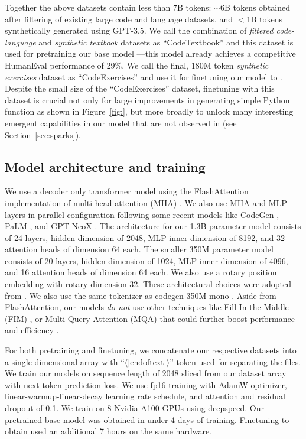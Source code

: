 Together the above datasets contain less than 7B tokens: $\sim$6B tokens obtained after filtering of existing large code and language datasets, and $<$1B tokens synthetically generated using GPT-3.5. 
We call the combination of \textit{filtered code-language} and \textit{synthetic textbook} datasets as ``CodeTextbook'' and this dataset is used for pretraining our base model \phionebase\!\!---this model already achieves a competitive HumanEval performance of 29\%. We call the final, 180M token \textit{synthetic exercises} dataset as ``CodeExercises'' and use it for finetuning our \phionebase model to \phione\!\!. Despite the small size of the ``CodeExercises'' dataset, finetuning with this dataset is crucial not only for large improvements in generating simple Python function as shown in Figure~\ref{fig:}, but more broadly to unlock many interesting emergent capabilities in our \phione model that are not observed in \phionebase (see Section~\ref{sec:sparks}). 
\fi
\subsection{Model architecture and training}\label{sec:arch}
 We use a decoder only transformer \cite{Vas17} model using the FlashAttention implementation of multi-head attention (MHA) \cite{dao2022flashattention}. %
 We also use MHA and MLP layers in parallel configuration following some recent models like CodeGen \cite{codegen}, PaLM \cite{chowdhery2022palm}, and GPT-NeoX \cite{gpt-neox-library}. The architecture for our 1.3B parameter \phione model consists of 24 layers, hidden dimension of 2048, MLP-inner dimension of 8192, and 32 attention heads of dimension 64 each. The smaller 350M parameter \phionesmall model consists of 20 layers, hidden dimension of 1024, MLP-inner dimension of 4096, and 16 attention heads of dimension 64 each. We also use a rotary position embedding \cite{rope-paper} with rotary dimension 32. These architectural choices were adopted from \cite{codegen}. We also use the same tokenizer as codegen-350M-mono \cite{codegen}. Aside from FlashAttention, our models \emph{do not} use other  techniques like Fill-In-the-Middle (FIM) \cite{bavarian2022efficient}, or Multi-Query-Attention (MQA) \cite{raffel2020exploring} that  could further boost performance and efficiency \cite{li2023starcoder}. 

For both pretraining and finetuning, we concatenate  our respective datasets into a single dimensional array with ``$\langle|\text{endoftext}|\rangle$'' token used for separating the files. We train our models on sequence length of 2048 sliced from our dataset array with next-token prediction loss. We use fp16 training with AdamW optimizer, linear-warmup-linear-decay learning rate schedule, and attention and residual dropout of 0.1. We train on 8 Nvidia-A100 GPUs using deepspeed. Our pretrained base model \phionebase was obtained in under 4 days of training. Finetuning to obtain \phione used an additional 7 hours on the same hardware.

